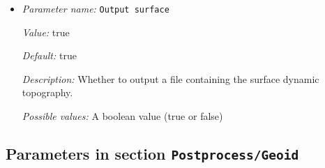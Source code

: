 \begin{itemize}
{\it Value:} true


{\it Default:} true


{\it Description:} Whether to output a file containing the bottom (i.e., CMB) dynamic topography.


{\it Possible values:} A boolean value (true or false)
\item {\it Parameter name:} {\tt Output surface}
\label{parameters:Postprocess/Dynamic topography/Output surface}


{\it Value:} true


{\it Default:} true


{\it Description:} Whether to output a file containing the surface dynamic topography.


{\it Possible values:} A boolean value (true or false)
\end{itemize}

\subsection{Parameters in section \tt Postprocess/Geoid}
\label{parameters:Postprocess/Geoid}


